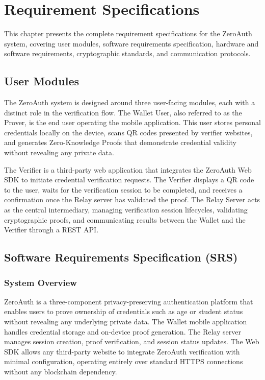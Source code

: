 \chapter{Requirement Specifications}

This chapter presents the complete requirement specifications for the ZeroAuth system, covering user modules, software requirements specification, hardware and software requirements, cryptographic standards, and communication protocols.

\section{User Modules}

The ZeroAuth system is designed around three user-facing modules, each with a distinct role in the verification flow. The Wallet User, also referred to as the Prover, is the end user operating the mobile application. This user stores personal credentials locally on the device, scans QR codes presented by verifier websites, and generates Zero-Knowledge Proofs that demonstrate credential validity without revealing any private data.

The Verifier is a third-party web application that integrates the ZeroAuth Web SDK to initiate credential verification requests. The Verifier displays a QR code to the user, waits for the verification session to be completed, and receives a confirmation once the Relay server has validated the proof. The Relay Server acts as the central intermediary, managing verification session lifecycles, validating cryptographic proofs, and communicating results between the Wallet and the Verifier through a REST API.

\section{Software Requirements Specification (SRS)}

\subsection{System Overview}

ZeroAuth is a three-component privacy-preserving authentication platform that enables users to prove ownership of credentials such as age or student status without revealing any underlying private data. The Wallet mobile application handles credential storage and on-device proof generation. The Relay server manages session creation, proof verification, and session status updates. The Web SDK allows any third-party website to integrate ZeroAuth verification with minimal configuration, operating entirely over standard HTTPS connections without any blockchain dependency.

